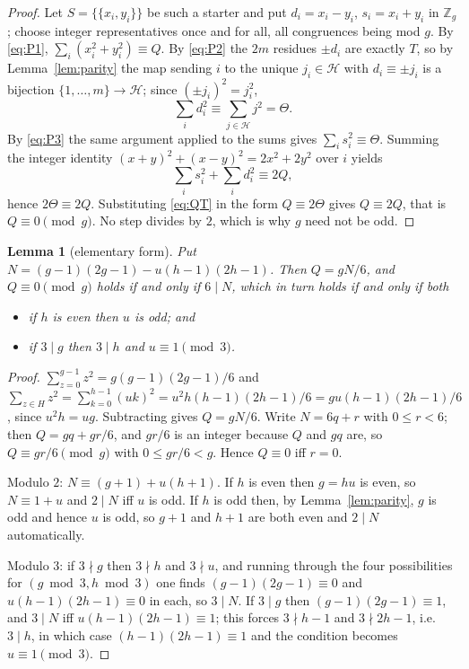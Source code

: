 \documentclass[11pt]{amsart}
\newtheorem{lemma}[theorem]{Lemma}
\theoremstyle{remark}
\begin{document}
\begin{proof}
Let $S=\{\{x_i,y_i\}\}$ be such a starter and put $d_i=x_i-y_i$,
$s_i=x_i+y_i$ in $\mathbb Z_g$; choose integer representatives once and for
all, all congruences being mod $g$. By \eqref{eq:P1},
$\sum_i(x_i^{2}+y_i^{2})\equiv Q$. By \eqref{eq:P2} the $2m$ residues $\pm
d_i$ are exactly $T$, so by Lemma~\ref{lem:parity} the map sending $i$ to the
unique $j_i\in\mathcal H$ with $d_i\equiv\pm j_i$ is a bijection
$\{1,\dots,m\}\to\mathcal H$; since $(\pm j_i)^{2}=j_i^{2}$,
\[
  \sum_i d_i^{2}\equiv\sum_{j\in\mathcal H}j^{2}=\Theta .
\]
By \eqref{eq:P3} the same argument applied to the sums gives
$\sum_i s_i^{2}\equiv\Theta$. Summing the integer identity
$(x+y)^{2}+(x-y)^{2}=2x^{2}+2y^{2}$ over $i$ yields
\[
  \sum_i s_i^{2}+\sum_i d_i^{2}\equiv 2Q,
\]
hence $2\Theta\equiv 2Q$. Substituting \eqref{eq:QT} in the form
$Q\equiv2\Theta$ gives $Q\equiv 2Q$, that is $Q\equiv0\pmod g$. No step
divides by $2$, which is why $g$ need not be odd.
\end{proof}

\begin{lemma}[elementary form]\label{lem:form}
Put $N=(g-1)(2g-1)-u(h-1)(2h-1)$. Then $Q=gN/6$, and
$Q\equiv0\pmod g$ holds if and only if $6\mid N$, which in turn holds if and
only if both
\begin{itemize}
\item[(i)] if $h$ is even then $u$ is odd; \quad and
\item[(ii)] if $3\mid g$ then $3\mid h$ and $u\equiv1\pmod 3$.
\end{itemize}
\end{lemma}

\begin{proof}
$\sum_{z=0}^{g-1}z^{2}=g(g-1)(2g-1)/6$ and
$\sum_{z\in H}z^{2}=\sum_{k=0}^{h-1}(uk)^{2}=u^{2}h(h-1)(2h-1)/6
 =gu(h-1)(2h-1)/6$, since $u^{2}h=ug$. Subtracting gives $Q=gN/6$. Write
$N=6q+r$ with $0\le r<6$; then $Q=gq+gr/6$, and $gr/6$ is an integer because
$Q$ and $gq$ are, so $Q\equiv gr/6\pmod g$ with $0\le gr/6<g$. Hence
$Q\equiv0$ iff $r=0$.

Modulo $2$: $N\equiv(g+1)+u(h+1)$. If $h$ is even then $g=hu$ is even, so
$N\equiv1+u$ and $2\mid N$ iff $u$ is odd. If $h$ is odd then, by
Lemma~\ref{lem:parity}, $g$ is odd and hence $u$ is odd, so $g+1$ and $h+1$
are both even and $2\mid N$ automatically.

Modulo $3$: if $3\nmid g$ then $3\nmid h$ and $3\nmid u$, and running through
the four possibilities for $(g\bmod 3,h\bmod 3)$ one finds
$(g-1)(2g-1)\equiv0$ and $u(h-1)(2h-1)\equiv0$ in each, so $3\mid N$. If
$3\mid g$ then $(g-1)(2g-1)\equiv1$, and $3\mid N$ iff
$u(h-1)(2h-1)\equiv1$; this forces $3\nmid h-1$ and $3\nmid 2h-1$, i.e.\
$3\mid h$, in which case $(h-1)(2h-1)\equiv1$ and the condition becomes
$u\equiv1\pmod 3$.
\end{proof}
\end{document}
